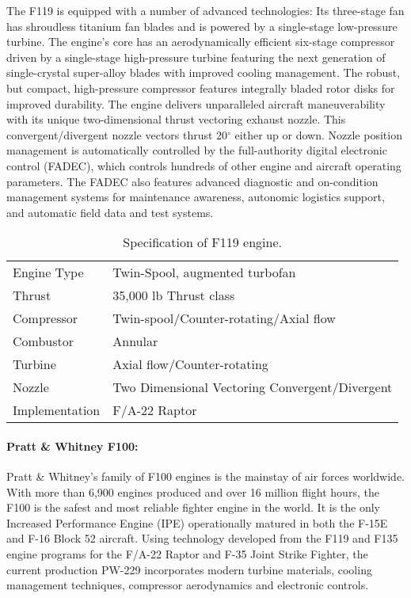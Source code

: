 The F119 is equipped with a number of advanced technologies: Its three-stage fan has shroudless titanium fan blades and is powered by a single-stage low-pressure turbine. The engine's core has an aerodynamically efficient six-stage compressor driven by a single-stage high-pressure turbine featuring the next generation of single-crystal super-alloy blades with improved cooling management. The robust, but compact, high-pressure compressor features integrally bladed rotor disks for improved durability. The engine delivers unparalleled aircraft maneuverability with its unique two-dimensional thrust vectoring exhaust nozzle. This convergent/divergent nozzle vectors thrust 20$^\circ$ either up or down. Nozzle position management is automatically controlled by the full-authority digital electronic control (FADEC), which controls hundreds of other engine and aircraft operating parameters. The FADEC also features advanced diagnostic and on-condition management systems for maintenance awareness, autonomic logistics support, and automatic field data and test systems.
\begin{table}[!htb!]
  \centering
\begin{tabular}{|p{}|p{}|}\hline
Engine Type &  Twin-Spool, augmented turbofan\\
Thrust & 35,000 lb Thrust class\\
Compressor & Twin-spool/Counter-rotating/Axial flow\\
Combustor & Annular\\
Turbine & Axial flow/Counter-rotating\\
Nozzle & Two Dimensional Vectoring Convergent/Divergent\\
Implementation& F/A-22 Raptor\\\hline
\end{tabular}
  \caption{\label{TAB_F119}Specification of F119 engine.}
\end{table}

\paragraph{Pratt \& Whitney F100:}
Pratt \& Whitney's family of F100 engines is the mainstay of air forces worldwide. With more than 6,900 engines produced and over 16 million flight hours, the F100 is the safest and most reliable fighter engine in the world. It is the only Increased Performance Engine (IPE) operationally matured in both the F-15E and F-16 Block 52 aircraft. Using technology developed from the F119 and F135 engine programs for the F/A-22 Raptor and F-35 Joint Strike Fighter, the current production PW-229 incorporates modern turbine materials, cooling management techniques, compressor aerodynamics and electronic controls.

